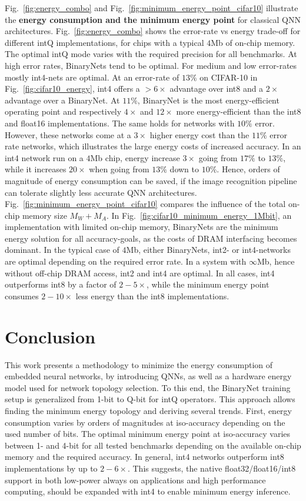 \documentclass[article,10pt]{IEEEtran}
\begin{document}
Fig.~\ref{fig:energy_combo} and Fig.~\ref{fig:minimum_energy_point_cifar10} illustrate the \textbf{energy consumption and the minimum energy point} for classical QNN architectures. Fig.~\ref{fig:energy_combo} shows the error-rate vs energy trade-off for different intQ implementations, for chips with a typical $4$Mb of on-chip memory. The optimal intQ mode varies with the required precision for all benchmarks. At high error rates, BinaryNets tend to be optimal. For medium and low error-rates mostly int4-nets are optimal. At an error-rate of $13\%$ on CIFAR-10 in Fig.~\ref{fig:cifar10_energy}, int4 offers a $>6\times$ advantage over int8 and a $2\times$ advantage over a BinaryNet. At $11\%$, BinaryNet is the most energy-efficient operating point and respectively $4\times$ and $12\times$ more energy-efficient than the int8 and float16 implementations. The same holds for networks with $10\%$ error. However, these networks come at a $3\times$ higher energy cost than the $11\%$ error rate networks, which illustrates the large energy costs of increased accuracy. In an int4 network run on a $4$Mb chip, energy increase $3\times$ going from $17\%$ to $13\%$, while it increases $20\times$ when going from $13\%$ down to $10\%$. Hence, orders of magnitude of energy consumption can be saved, if the image recognition pipeline can tolerate slightly less accurate QNN architectures.
Fig.~\ref{fig:minimum_energy_point_cifar10} compares the influence of the total on-chip memory size $M_W + M_A$. In Fig.~\ref{fig:cifar10_minimum_energy_1Mbit}, an implementation with limited on-chip memory, BinaryNets are the minimum energy solution for all accuracy-goals, as the costs of DRAM interfacing becomes dominant. In the typical case of $4$Mb, either BinaryNets, int2- or int4-networks are optimal depending on the required error rate. In a system with $\infty$Mb, hence without off-chip DRAM access, int2 and int4 are optimal. In all cases, int4 outperforms int8 by a factor of $2-5\times$, while the minimum energy point consumes $2-10\times$ less energy than the int8 implementations. 



\section{Conclusion}
\label{sec:conclusion}
This work presents a methodology to minimize the energy consumption of embedded neural networks, by introducing QNNs, as well as a hardware energy model used for network topology selection. To this end, the BinaryNet training setup is generalized from 1-bit to Q-bit for intQ operators. This approach allows finding the minimum energy topology and deriving several trends. First, energy consumption varies by orders of magnitudes at iso-accuracy depending on the used number of bits. The optimal minimum energy point at iso-accuracy varies between 1- and 4-bit for all tested benchmarks depending on the available on-chip memory and the required accuracy. In general, int4 networks outperform int8 implementations by up to $2-6\times$. This suggests, the native float32/float16/int8 support in both low-power always on applications and high performance computing, should be expanded with int4 to enable minimum energy inference. 
\end{document}
